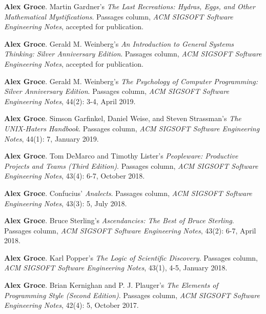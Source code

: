 \documentclass[ComputerScience]{vita}
\begin{document}
\begin{vita}
\begin{Columns, Book Reviews, and Magazine Articles}
\item {\bf Alex Groce}. 
\newblock Martin Gardner's \emph{The Last Recreations: Hydras, Eggs, and Other Mathematical Mystifications}.
\newblock Passages column, \emph{ACM SIGSOFT Software Engineering
  Notes}, accepted for publication.
  
\item {\bf Alex Groce}. 
\newblock Gerald M. Weinberg's \emph{An Introduction to General
  Systems Thinking: Silver Anniversary Edition}.
\newblock Passages column, \emph{ACM SIGSOFT Software Engineering
  Notes}, accepted for publication.
  
\item {\bf Alex Groce}. 
\newblock Gerald M. Weinberg's \emph{The Psychology of Computer
  Programming: Silver Anniversary Edition}.
\newblock Passages column, \emph{ACM SIGSOFT Software Engineering
  Notes}, 44(2): 3-4, April 2019.
  
\item {\bf Alex Groce}.
\newblock Simson Garfinkel, Daniel Weise, and Steven Strassman's \emph{The UNIX-Haters Handbook}. 
\newblock Passages column, \emph{ACM SIGSOFT Software Engineering 
  Notes}, 44(1): 7, January 2019.

\item {\bf Alex Groce}. 
\newblock Tom DeMarco and Timothy Lister's \emph{Peopleware: Productive Projects and Teams (Third Edition)}. 
\newblock Passages column, \emph{ACM SIGSOFT Software Engineering 
  Notes}, 43(4): 6-7, October 2018.

\item {\bf Alex Groce}. 
\newblock Confucius' \emph{Analects}. 
\newblock Passages column, \emph{ACM SIGSOFT Software Engineering 
  Notes}, 43(3): 5, July 2018.

\item {\bf Alex Groce}. 
\newblock Bruce Sterling's \emph{Ascendancies: The Best of Bruce Sterling}. 
\newblock Passages column, \emph{ACM SIGSOFT Software Engineering Notes}, 43(2): 6-7, April 2018.

\item {\bf Alex Groce}.
\newblock Karl Popper's \emph{The Logic of Scientific Discovery}.
\newblock Passages column, \emph{ACM SIGSOFT Software Engineering Notes}, 43(1), 4-5, January 2018.

\item {\bf Alex Groce}.
\newblock Brian Kernighan and P. J. Plauger's \emph{The Elements of Programming Style (Second Edition)}.
\newblock Passages column, \emph{ACM SIGSOFT Software Engineering Notes}, 42(4): 5, October 2017.


\end{Columns, Book Reviews, and Magazine Articles}
\end{vita}
\end{document}
